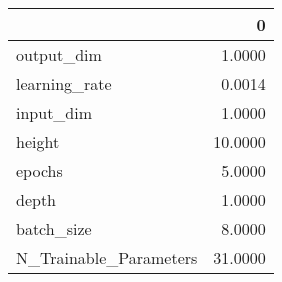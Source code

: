 \begin{tabular}{lr}
\toprule
{} &        0 \\
\midrule
output\_dim             &   1.0000 \\
learning\_rate          &   0.0014 \\
input\_dim              &   1.0000 \\
height                 &  10.0000 \\
epochs                 &   5.0000 \\
depth                  &   1.0000 \\
batch\_size             &   8.0000 \\
N\_Trainable\_Parameters &  31.0000 \\
\bottomrule
\end{tabular}
